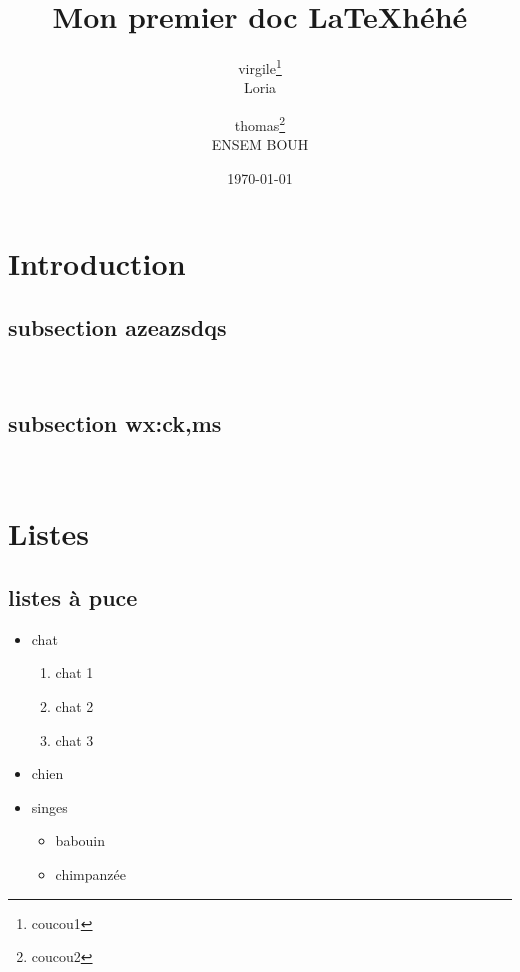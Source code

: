 \documentclass[a4paper,12pt]{article}
\begin{document}
\title{Mon premier doc \LaTeX héhé}
\author{virgile\thanks{coucou1}\\Loria \and thomas\thanks{coucou2}\\ENSEM BOUH}%
\date{\today}


\maketitle

\begin{abstract}
\blindtext
\end{abstract}

\setcounter{tocdepth}{4} %
\setcounter{secnumdepth}{3}%
\setcounter{page}{100}%
\tableofcontents
\section{Introduction}


\subsection{subsection azeazsdqs}
\blindtext \\
\subsection{subsection wx:ck,ms}
\blindtext \\

\newpage
\section{Listes}
\subsection{listes à puce}

\renewcommand\labelitemi{X}

\begin{itemize}
  \item chat
  \begin{enumerate}
    \item chat 1
    \item chat 2
    \item chat 3
  \end{enumerate}
  \item chien
  \item singes
  \begin{itemize}
    \item babouin
    \item chimpanzée
  \end{itemize}
\end{itemize}
\end{document}
